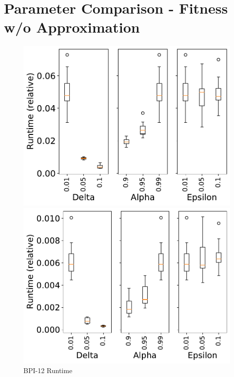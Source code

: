 \documentclass[landscape]{article}
\begin{document}
	\section*{Parameter Comparison - Fitness w/o Approximation}
	\begin{figure}[!htb]
		\centering
		\begin{minipage}{0.2\textwidth}
			\includegraphics[width=1.0\textwidth]{../BPI_Challenge_2012/BPI_Challenge_2012_param_time.pdf}
			\caption{BPI-12 Runtime}
		\end{minipage}
		\hfill
		\begin{minipage}{0.2\textwidth}
			\includegraphics[width=1.0\textwidth]{../Detail_Incident_Activity/Detail_Incident_Activity_param_time.pdf}

\end{minipage}
\end{figure}
\end{document}
